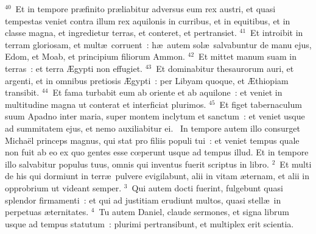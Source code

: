 ${}^{40}$~Et in tempore pr\ae finito pr\ae liabitur adversus eum rex austri, et quasi tempestas veniet contra illum rex aquilonis in curribus, et in equitibus, et in classe magna, et ingredietur terras, et conteret, et pertransiet.
${}^{41}$~Et introibit in terram gloriosam, et mult\ae\ corruent~: h\ae\ autem sol\ae\ salvabuntur de manu ejus, Edom, et Moab, et principium filiorum Ammon.
${}^{42}$~Et mittet manum suam in terras~: et terra \AE gypti non effugiet.
${}^{43}$~Et dominabitur thesaurorum auri, et argenti, et in omnibus pretiosis \AE gypti~: per Libyam quoque, et \AE thiopiam transibit.
${}^{44}$~Et fama turbabit eum ab oriente et ab aquilone~: et veniet in multitudine magna ut conterat et interficiat plurimos.
${}^{45}$~Et figet tabernaculum suum Apadno inter maria, super montem inclytum et sanctum~: et veniet usque ad summitatem ejus, et nemo auxiliabitur ei.
~\lettrine[lines=10,image=true,loversize=0.05,lraise=-0.03]{I}{}n tempore autem illo consurget Micha\"el princeps magnus, qui stat pro filiis populi tui~: et veniet tempus quale non fuit ab eo ex quo gentes esse cœperunt usque ad tempus illud. Et in tempore illo salvabitur populus tuus, omnis qui inventus fuerit scriptus in libro.
${}^{2}$~Et multi de his qui dormiunt in terr\ae\ pulvere evigilabunt, alii in vitam \ae ternam, et alii in opprobrium ut videant semper.
${}^{3}$~Qui autem docti fuerint, fulgebunt quasi splendor firmamenti~: et qui ad justitiam erudiunt multos, quasi stell\ae\ in perpetuas \ae ternitates.
${}^{4}$~Tu autem Daniel, claude sermones, et signa librum usque ad tempus statutum~: plurimi pertransibunt, et multiplex erit scientia.


